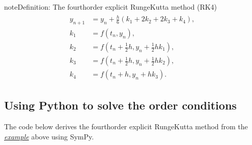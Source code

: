 \documentclass[letterpaper,10pt,english]{jupyterBook}
\begin{document}
\begin{sphinxadmonition}{note}{Definition: The fourth\sphinxhyphen{}order explicit Runge\sphinxhyphen{}Kutta method (RK4)}
\begin{equation}\label{equation:2_ERKs/2.2_RK4_Derivation:rk4-equation}
\begin{split}\begin{align*}
    y_{n+1} &= y_n + \frac{h}{6}(k_1 + 2 k_2 + 2 k_3 + k_4), \\
    k_1 &= f(t_n, y_n), \\
    k_2 &= f(t_n + \tfrac{1}{2} h, y_n + \tfrac{1}{2} h k_1), \\
    k_3 &= f(t_n + \tfrac{1}{2} h, y_n + \tfrac{1}{2} h k_2), \\
    k_4 &= f(t_n + h, y_n + h k_3).
\end{align*} \end{split}
\end{equation}\end{sphinxadmonition}


\subsection{Using Python to solve the order conditions}
\label{\detokenize{2_ERKs/2.2_RK4_Derivation:using-python-to-solve-the-order-conditions}}
\sphinxAtStartPar
The code below derives the fourth\sphinxhyphen{}order explicit Runge\sphinxhyphen{}Kutta method from the {\hyperref[\detokenize{2_ERKs/2.2_RK4_Derivation:rk4-derivation-example}]{\emph{example}}} above using SymPy.
\end{document}
